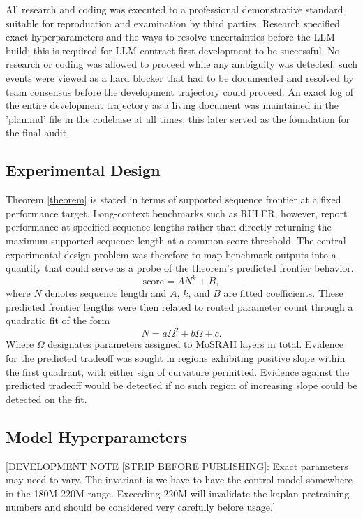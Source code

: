 \documentclass[11pt]{article}
\begin{document}
All research and coding was executed to a professional demonstrative standard suitable for reproduction and examination by third parties. Research specified exact hyperparameters and the ways to resolve uncertainties before the LLM build; this is required for LLM contract-first development to be successful. No research or coding was allowed to proceed while any ambiguity was detected; such events were viewed as a hard blocker that had to be documented and resolved by team consensus before the development trajectory could proceed. An exact log of the entire development trajectory as a living document was maintained in the 'plan.md' file in the codebase at all times; this later served as the foundation for the final audit.

\subsection{Experimental Design}

Theorem \ref{theorem} is stated in terms of supported sequence frontier at a fixed performance target. Long-context benchmarks such as RULER, however, report performance at specified sequence lengths rather than directly returning the maximum supported sequence length at a common score threshold. The central experimental-design problem was therefore to map benchmark outputs into a quantity that could serve as a probe of the theorem's predicted frontier behavior.
\[
\mathrm{score} = A N^{k} + B,
\]
where $N$ denotes sequence length and $A$, $k$, and $B$ are fitted coefficients. These predicted frontier lengths were then related to routed parameter count through a quadratic fit of the form
\[
N = a\Omega^2 + b\Omega + c.
\]
Where $\Omega$ designates parameters assigned to MoSRAH layers in total. Evidence for the predicted tradeoff was sought in regions exhibiting positive slope within the first quadrant, with either sign of curvature permitted. Evidence against the predicted tradeoff would be detected if no such region of increasing slope could be detected on the fit.

\subsection{Model Hyperparameters}
\label{app:hyperparameters}

[DEVELOPMENT NOTE [STRIP BEFORE PUBLISHING]: Exact parameters may need to vary. The invariant is we have to have the control model somewhere in the 180M-220M range. Exceeding 220M will invalidate the kaplan pretraining numbers and should be considered very carefully before usage.]
\end{document}
